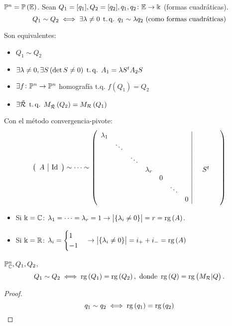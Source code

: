 \begin{defi}
  $\mathbb{P}^n = \mathbb{P}\left( \mathbb{E} \right)$. Sean $Q_1 = [q_1], Q_2 = [q_2], q_1,q_2 \colon \mathbb{E} \to \Bbbk$ (formas cuadráticas).
  \[
    Q_1 \sim Q_2 \iff \exists \lambda \neq 0 \operatorname{\;t.q.\;} q_1\sim \lambda q_2 \text{ (como formas cuadráticas)}
  \]
\end{defi}
\begin{obs}
  Son equivalentes:
  \begin{itemize}
    \item $Q_1 \sim Q_2$
    \item $\exists \lambda \neq 0, \exists S \left( \det S\neq 0\right) \operatorname{\;t.q.\;} A_1 = \lambda S^tA_2S$
    \item $\exists f\colon \mathbb{P}^n \to \mathbb{P}^n$ homografía t.q. $f\left( Q_1 \right) = Q_2$
    \item $\exists \tilde{\mathcal{R}} \operatorname{\;t.q.\;} M_{\tilde{\mathcal{R}}} \left( Q_2 \right) = M_{\mathcal{R}}\left( Q_1 \right)$
  \end{itemize}
\end{obs}
\begin{obs}
  Con el método convergencia-pivote: 
  \[
    \left( 
    \begin{array}{c|c}
      A & \operatorname{Id}
    \end{array} \right)
    \sim \dots \sim
    \left( 
    \begin{array}{ccccccc|c}
      \lambda_1 & & & & & & & \\
      & \ddots & & & & & & \\
      & & \ddots & & & & & \\
      & & & \lambda_r & & & &\quad S^t\quad \\
      & & & & 0 & & & \\
      & & & & & \ddots & & \\
      & & & & & & 0 & \\
    \end{array}
    \right)
  \]
  \begin{itemize}
    \item Si $\Bbbk = \mathbb{C}$: $\lambda_1 = \dots = \lambda_r = 1 \to \begin{vmatrix}\left\{ \lambda_i\neq 0 \right\}\end{vmatrix} = r = \operatorname{rg}\left( A \right)$.
    \item Si $\Bbbk = \mathbb{R}$: $\lambda_i =
      \begin{cases}
        1 \\
        -1
      \end{cases}
      \to \begin{vmatrix}\left\{ \lambda_i\neq 0 \right\}\end{vmatrix} = i_+ + i_- = \operatorname{rg}\left( A \right)$
  \end{itemize}
\end{obs}
\begin{prop}
  $\mathbb{P}_{\mathbb{C}}^n, Q_1, Q_2$,
  \[
    Q_1 \sim Q_2 \iff \operatorname{rg}\left( Q_1 \right) = \operatorname{rg}\left( Q_2 \right),\text{ donde }\operatorname{rg}\left( Q \right) = \operatorname{rg}\left( M_{\mathcal{R}} | Q \right).
  \]
\end{prop}
\begin{proof}
  \[ q_1 \sim q_2 \iff \operatorname{rg} \left( q_1 \right) = \operatorname{rg} \left( q_2 \right) \]
\end{proof}

